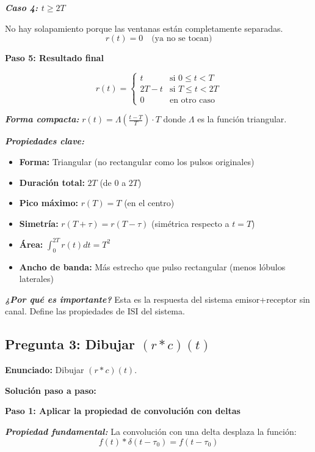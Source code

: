 \documentclass[11pt,a4paper]{article}
\begin{document}
\textit{\textbf{Caso 4: $t \geq 2T$}}

No hay solapamiento porque las ventanas est\'an completamente separadas.
\[
r(t) = 0 \quad \text{(ya no se tocan)}
\]

\textbf{Paso 5: Resultado final}

\[
\boxed{r(t) = \begin{cases}
t & \text{si } 0 \leq t < T \\
2T - t & \text{si } T \leq t < 2T \\
0 & \text{en otro caso}
\end{cases}}
\]

\textit{\textbf{Forma compacta:}} $r(t) = \Lambda\left(\frac{t-T}{T}\right) \cdot T$ donde $\Lambda$ es la funci\'on triangular.

\textit{\textbf{Propiedades clave:}}
\begin{itemize}
    \item \textbf{Forma:} Triangular (no rectangular como los pulsos originales)
    \item \textbf{Duraci\'on total:} $2T$ (de $0$ a $2T$)
    \item \textbf{Pico m\'aximo:} $r(T) = T$ (en el centro)
    \item \textbf{Simetr\'ia:} $r(T+\tau) = r(T-\tau)$ (sim\'etrica respecto a $t=T$)
    \item \textbf{\'Area:} $\int_0^{2T} r(t) dt = T^2$
    \item \textbf{Ancho de banda:} M\'as estrecho que pulso rectangular (menos lóbulos laterales)
\end{itemize}

\textit{\textbf{¿Por qu\'e es importante?}} Esta es la respuesta del sistema emisor+receptor sin canal. Define las propiedades de ISI del sistema.

\subsection*{Pregunta 3: Dibujar $(r * c)(t)$}

\textbf{Enunciado:} Dibujar $(r * c)(t)$.

\vspace{0.3cm}
\textbf{Soluci\'on paso a paso:}

\textbf{Paso 1: Aplicar la propiedad de convoluci\'on con deltas}

\textit{\textbf{Propiedad fundamental:}} La convoluci\'on con una delta desplaza la funci\'on:
\[
f(t) * \delta(t-\tau_0) = f(t-\tau_0)
\]
\end{document}
